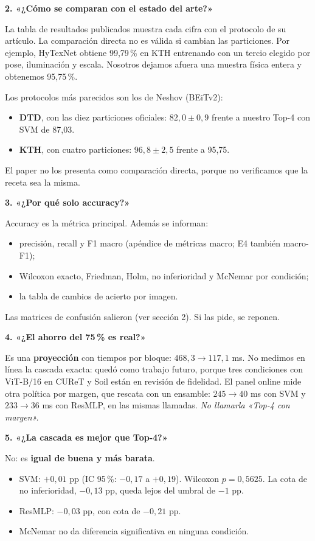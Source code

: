\documentclass[11pt,a4paper]{article}
\newcommand{\preg}[1]{\par\medskip\textbf{\color{azulosc}#1}\par}
\begin{document}
\preg{2. «¿Cómo se comparan con el estado del arte?»}
La tabla de resultados publicados muestra cada cifra con el protocolo de su artículo. La comparación directa no es válida si cambian las particiones. Por ejemplo, HyTexNet obtiene 99,79\,\% en KTH entrenando con un tercio elegido por pose, iluminación y escala. Nosotros dejamos afuera una muestra física entera y obtenemos 95,75\,\%.

Los protocolos más parecidos son los de Neshov (BEiTv2):
\begin{itemize}
\item \textbf{DTD}, con las diez particiones oficiales: $82{,}0\pm0{,}9$ frente a nuestro Top-4 con SVM de 87,03.
\item \textbf{KTH}, con cuatro particiones: $96{,}8\pm2{,}5$ frente a 95,75.
\end{itemize}
El paper no los presenta como comparación directa, porque no verificamos que la receta sea la misma.

\preg{3. «¿Por qué solo accuracy?»}
Accuracy es la métrica principal. Además se informan:
\begin{itemize}
\item precisión, recall y F1 macro (apéndice de métricas macro; E4 también macro-F1);
\item Wilcoxon exacto, Friedman, Holm, no inferioridad y McNemar por condición;
\item la tabla de cambios de acierto por imagen.
\end{itemize}
Las matrices de confusión salieron (ver sección 2). Si las pide, se reponen.

\preg{4. «¿El ahorro del 75\,\% es real?»}
Es una \textbf{proyección} con tiempos por bloque: $468{,}3 \to 117{,}1$ ms. No medimos en línea la cascada exacta: quedó como trabajo futuro, porque tres condiciones con ViT-B/16 en CUReT y Soil están en revisión de fidelidad. El panel online mide otra política por margen, que rescata con un ensamble: $245 \to 40$ ms con SVM y $233 \to 36$ ms con ResMLP, en las mismas llamadas. \emph{No llamarla «Top-4 con margen».}

\preg{5. «¿La cascada es mejor que Top-4?»}
No: es \textbf{igual de buena y más barata}.
\begin{itemize}
\item SVM: $+0{,}01$ pp (IC 95\,\%: $-0{,}17$ a $+0{,}19$). Wilcoxon $p=0{,}5625$. La cota de no inferioridad, $-0{,}13$ pp, queda lejos del umbral de $-1$ pp.
\item ResMLP: $-0{,}03$ pp, con cota de $-0{,}21$ pp.
\item McNemar no da diferencia significativa en ninguna condición.
\end{itemize}
\end{document}
